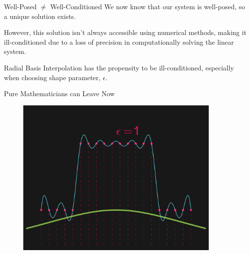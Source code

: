 \documentclass[12pt,t]{beamer}
\newcommand{\subt}[1]{{\footnotesize \color{subtitle} {#1}}}
\begin{document}
\begin{frame}{Well-Posed $\neq$ Well-Conditioned}
We now know that our system is well-posed, so a unique solution exists.

\bigskip

However, this solution isn't always accessible using numerical methods, making it \subt{ill-conditioned} due to a loss of precision in computationally solving the linear system.

\bigskip

Radial Basis Interpolation has the propensity to be ill-conditioned, especially when choosing shape parameter, $\epsilon$.



\note{}
\end{frame}

\begin{frame}{Pure Mathematicians can Leave Now}

\begin{figure}
\includegraphics[width=0.9\textwidth, keepaspectratio]{conditioned.png}
\end{figure}


\note{}
\end{frame}
\end{document}

